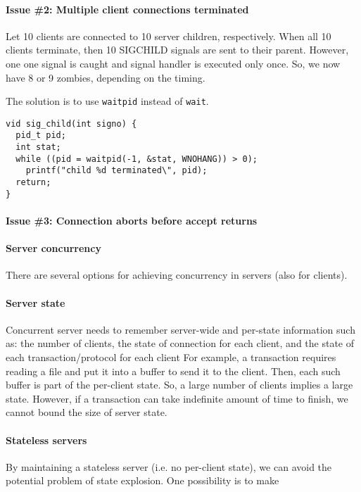\documentclass{memo}
\begin{document}
\paragraph{Issue \#2: Multiple client connections terminated}
Let 10 clients are connected to 10 server children, respectively. 
When all 10 clients terminate, then 10 SIGCHILD signals are sent to their
parent. However, one one signal is caught and signal handler is executed only
once.  So, we now have 8 or 9
zombies, depending on the timing.

The solution is to use \verb+waitpid+ instead of \verb+wait+.
\begin{verbatim}
vid sig_child(int signo) {
  pid_t pid;
  int stat;
  while ((pid = waitpid(-1, &stat, WNOHANG)) > 0);
    printf("child %d terminated\", pid);
  return;
}
\end{verbatim}

\paragraph{Issue \#3: Connection aborts before accept returns}


\paragraph{Server concurrency}
There are several options for achieving concurrency in servers (also for
clients). 
\bit
\w {}
\w {}
\w {}
\eit

\paragraph{Server state}
Concurrent server needs to remember server-wide and per-state information such as:
\bit
\w the number of clients, 
\w the state of connection for each client, and
\w the state of each transaction/protocol for each client
\eit
For example, a transaction requires reading a file and put it into a buffer to
send it to the client. Then, each such buffer is part of the per-client state.
So, a large number of clients implies a large state.  However, if a
transaction can take indefinite amount of time to finish, we cannot bound the
size of server state.

\paragraph{Stateless servers}
By maintaining a stateless server (i.e. no per-client state), we can avoid the
potential problem of state explosion. One possibility is to make
\end{document}
